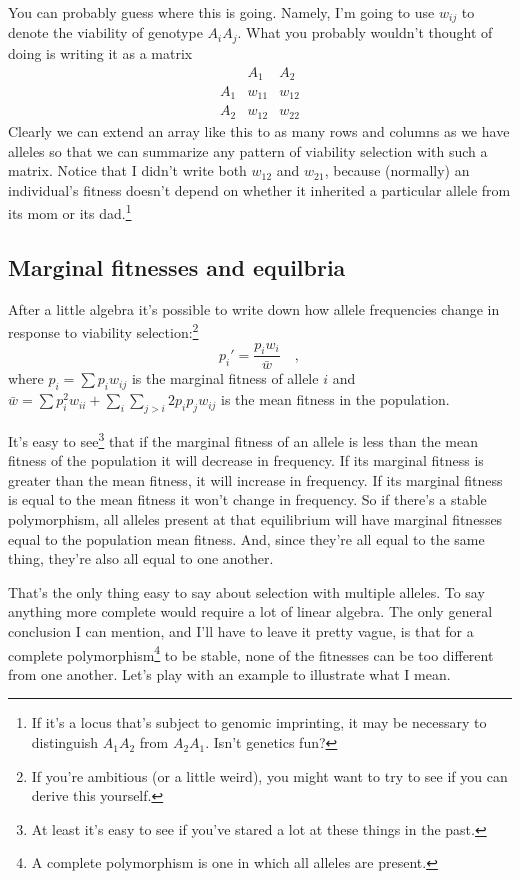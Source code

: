 \noindent You can probably guess where this is going. Namely, I'm
going to use $w_{ij}$ to denote the viability of genotype
$A_iA_j$. What you probably wouldn't thought of doing is writing it as
a matrix
\[
\begin{array}{ccc}
    & A_1  & A_2 \\
A_1 & w_{11} & w_{12} \\
A_2 & w_{12} & w_{22} 
\end{array}
\]
Clearly we can extend an array like this to as many rows and columns
as we have alleles so that we can summarize any pattern of viability
selection with such a matrix. Notice that I didn't write both $w_{12}$
and $w_{21}$, because (normally) an individual's fitness doesn't
depend on whether it inherited a particular allele from its mom or its
dad.\footnote{If it's a locus that's subject to genomic imprinting, it
  may be necessary to distinguish $A_1A_2$ from $A_2A_1$. Isn't
  genetics fun?}

\subsection*{Marginal fitnesses and
  equilbria}

After a little algebra it's possible to write down how allele
frequencies change in response to viability selection:\footnote{If
  you're ambitious (or a little weird), you might want to try to see
  if you can derive this yourself.}
\[
p_i' = \frac{p_iw_i}{\bar w} \quad ,
\]
where $p_i = \sum p_i w_{ij}$ is the marginal fitness of allele $i$ and
$\bar w = \sum p_i^2 w_{ii} + \sum_i\sum_{j>i} 2p_ip_jw_{ij}$ is the
mean fitness in the population.

It's easy to see\footnote{At least it's easy to see if you've stared a
  lot at these things in the past.} that if the marginal fitness of an
allele is less than the mean fitness of the population it will
decrease in frequency. If its marginal fitness is greater than the
mean fitness, it will increase in frequency.  If its marginal fitness
is equal to the mean fitness it won't change in frequency. So if
there's a stable polymorphism, all alleles present at that equilibrium
will have marginal fitnesses equal to the population mean
fitness. And, since they're all equal to the same thing, they're also
all equal to one another.

That's the only thing easy to say about selection with multiple
alleles. To say anything more complete would require a lot of linear
algebra. The only general conclusion I can mention, and I'll have to
leave it pretty vague, is that for a complete polymorphism\footnote{A
complete polymorphism is one in which all alleles are present.} to be
stable, none of the fitnesses can be too different from one
another. Let's play with an example to illustrate what I mean.

